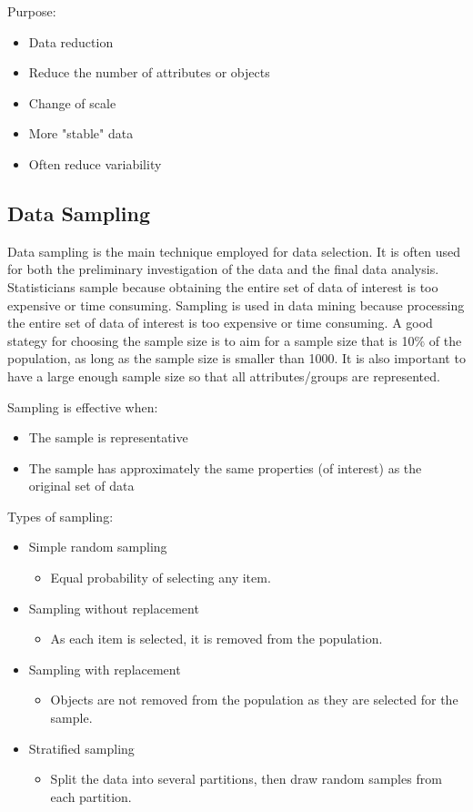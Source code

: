 \medskip
Purpose:
\begin{itemize}
    \item Data reduction
    \item Reduce the number of attributes or objects
    \item Change of scale
    \item More "stable" data
    \item Often reduce variability
\end{itemize}

\subsection{Data Sampling}
Data sampling is the main technique employed for data selection.
It is often used for both the preliminary investigation of the data and the final data analysis.
Statisticians sample because obtaining the entire set of data of interest is too expensive or time consuming.
Sampling is used in data mining because processing the entire set of data of interest is too expensive or time consuming.
A good stategy for choosing the sample size is to aim for a sample size that is 10$\%$ of the population, as long as the sample size is smaller than 1000.
It is also important to have a large enough sample size so that all attributes/groups are represented.

\medskip
Sampling is effective when:
\begin{itemize}
    \item The sample is representative
    \item The sample has approximately the same properties (of interest) as the original set of data
\end{itemize}

\medskip
Types of sampling:
\begin{itemize}
    \item Simple random sampling
    \begin{itemize}
        \item Equal probability of selecting any item.
    \end{itemize}
    \item Sampling without replacement
    \begin{itemize}
        \item As each item is selected, it is removed from the population.
    \end{itemize}
    \item Sampling with replacement
    \begin{itemize}
        \item Objects are not removed from the population as they are selected for the sample.
    \end{itemize}
    \item Stratified sampling
    \begin{itemize}
        \item Split the data into several partitions, then draw random samples from each partition.
    \end{itemize}
\end{itemize}

